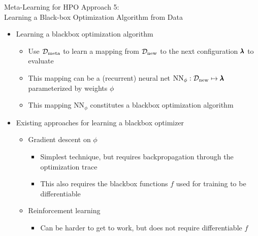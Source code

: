 \begin{frame}[c]{Meta-Learning for HPO Approach 5:\\ Learning a Black-box Optimization Algorithm from Data}

\begin{itemize}
    \item \alert{Learning} a blackbox optimization algorithm
    \begin{itemize}
        \item Use $\mathcal{D}_{\text{meta}}$ to learn a mapping from $\mathcal{D}_{\text{new}}$ to the next configuration $\pmb{\lambda}$ to evaluate
        \item This mapping can be a (recurrent) neural net $\text{NN}_{\phi}: \mathcal{D}_{\text{new}} \mapsto \pmb{\lambda}$ parameterized by weights $\phi$   
\pause        
\smallskip
        \item \alert{This mapping $\text{NN}_{\phi}$ constitutes a blackbox optimization algorithm}


\pause
\bigskip
    
    \end{itemize}
    
    \item Existing approaches for learning a blackbox optimizer
    \begin{itemize}
        \item \alert{Gradient descent} on $\phi$  
        \begin{itemize}
            \item Simplest technique, but requires backpropagation through the optimization trace
            \item This also requires the blackbox functions $f$ used for training to be differentiable
       \end{itemize}
\pause
        \item \alert{Reinforcement learning} 
        \begin{itemize}
            \item Can be harder to get to work, but does not require differentiable $f$
        \end{itemize}
    

\end{itemize}
\end{itemize}
\end{frame}
